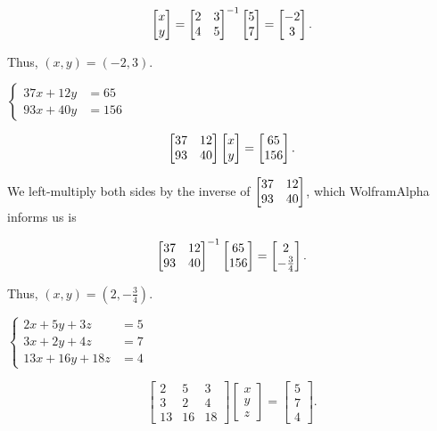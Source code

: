 \documentclass[../gatm_answers.tex]{subfiles}
\begin{document}
$$\begin{bmatrix} x \\ y \end{bmatrix} = \begin{bmatrix} 2 & 3 \\ 4 & 5 \end{bmatrix}^{-1}\begin{bmatrix} 5 \\ 7 \end{bmatrix} = \begin{bmatrix} -2 \\ 3 \end{bmatrix}.$$

Thus, $(x,y) = (-2,3)$.

\begin{inner_problem}
\item $\begin{cases} 37x+12y &= 65 \\ 93x+40y &= 156\end{cases}$
\end{inner_problem}

$$\begin{bmatrix} 37 & 12 \\ 93 & 40 \end{bmatrix}\begin{bmatrix} x \\ y \end{bmatrix} = \begin{bmatrix} 65 \\ 156 \end{bmatrix}.$$

We left-multiply both sides by the inverse of $\begin{bmatrix} 37 & 12 \\ 93 & 40 \end{bmatrix}$, which WolframAlpha informs us is

$$\begin{bmatrix} 37 & 12 \\ 93 & 40 \end{bmatrix}^{-1} \begin{bmatrix} 65 \\ 156 \end{bmatrix}=\begin{bmatrix} 2 \\ -\frac{3}{4} \end{bmatrix}.$$

Thus, $(x,y) = \left(2, -\frac{3}{4} \right)$.

\begin{inner_problem}
\item $\begin{cases} 2x+5y+3z &= 5 \\ 3x+2y+4z &= 7 \\ 13x+16y+18z &= 4\end{cases}$
\end{inner_problem}

$$\begin{bmatrix} 2 & 5 & 3 \\ 3 & 2 & 4 \\ 13 & 16 & 18 \end{bmatrix}\begin{bmatrix} x \\ y \\ z \end{bmatrix} = \begin{bmatrix} 5 \\ 7 \\ 4 \end{bmatrix}.$$
\end{document}
